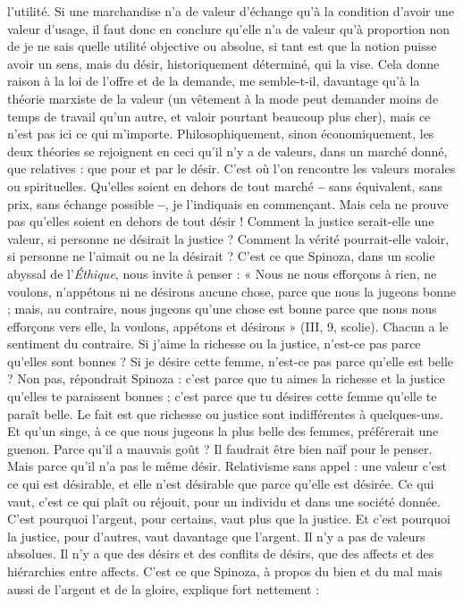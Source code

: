 l'utilité. Si une marchandise n’a de valeur d'échange qu’à la condition d’avoir
une valeur d'usage, il faut donc en conclure qu’elle n’a de valeur qu’à proportion
non de je ne sais quelle utilité objective ou absolue, si tant est que la
notion puisse avoir un sens, mais du désir, historiquement déterminé, qui la
vise. Cela donne raison à la loi de l'offre et de la demande, me semble-t-il,
davantage qu’à la théorie marxiste de la valeur (un vêtement à la mode peut
demander moins de temps de travail qu’un autre, et valoir pourtant beaucoup
plus cher), mais ce n’est pas ici ce qui m'importe. Philosophiquement, sinon
économiquement, les deux théories se rejoignent en ceci qu’il n’y a de valeurs,
dans un marché donné, que relatives : que pour et par le désir. C’est où l’on
rencontre les valeurs morales ou spirituelles. Qu’elles soient en dehors de tout
marché {\bf --} sans équivalent, sans prix, sans échange possible {\bf --}, je l’indiquais en
commençant. Mais cela ne prouve pas qu’elles soient en dehors de tout désir !
Comment la justice serait-elle une valeur, si personne ne désirait la justice ?
Comment la vérité pourrait-elle valoir, si personne ne l’aimait ou ne la
désirait ? C’est ce que Spinoza, dans un scolie abyssal de l’{\it Éthique}, nous invite
à penser : « Nous ne nous efforçons à rien, ne voulons, n’appétons ni ne désirons
aucune chose, parce que nous la jugeons bonne ; mais, au contraire, nous
jugeons qu’une chose est bonne parce que nous nous efforçons vers elle, la voulons,
appétons et désirons » (III, 9, scolie). Chacun a le sentiment du contraire.
Si j'aime la richesse ou la justice, n’est-ce pas parce qu’elles sont bonnes ? Si je
désire cette femme, n’est-ce pas parce qu’elle est belle ? Non pas, répondrait
Spinoza : c’est parce que tu aimes la richesse et la justice qu’elles te paraissent
bonnes ; c’est parce que tu désires cette femme qu’elle te paraît belle. Le fait est
que richesse ou justice sont indifférentes à quelques-uns. Et qu’un singe, à ce
que nous jugeons la plus belle des femmes, préférerait une guenon. Parce qu’il
a mauvais goût ? Il faudrait être bien naïf pour le penser. Mais parce qu’il n’a
pas le même désir. Relativisme sans appel : une valeur c’est ce qui est désirable,
et elle n’est désirable que parce qu’elle est désirée. Ce qui vaut, c’est ce qui plaît
ou réjouit, pour un individu et dans une société donnée. C’est pourquoi
l'argent, pour certains, vaut plus que la justice. Et c’est pourquoi la justice,
pour d’autres, vaut davantage que l’argent. Il n’y a pas de valeurs absolues. Il
n'y a que des désirs et des conflits de désirs, que des affects et des hiérarchies
entre affects. C’est ce que Spinoza, à propos du bien et du mal mais aussi de
l'argent et de la gloire, explique fort nettement :

